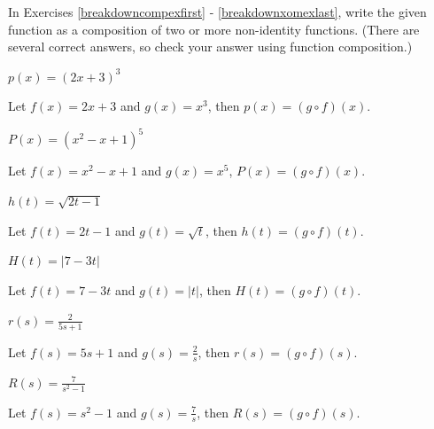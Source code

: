 \documentclass{ximera}
\begin{document}
\begin{question}
In Exercises \ref{breakdowncompexfirst} - \ref{breakdownxomexlast},  write the given function as a composition of two or more non-identity functions.  (There are several correct answers, so check your answer using function composition.)

\begin{problem}\label{breakdowncompexfirst}
$p(x) = (2x+3)^3$ 

\begin{solution}
    Let $f(x) = 2x+3$ and $g(x) = x^3$, then $p(x) = (g\circ f)(x)$.
\end{solution}
\end{problem}

\begin{problem}
$P(x) = \left(x^2-x+1\right)^5$

\begin{solution}
    Let $f(x) = x^2-x+1$ and $g(x) = x^5$,  $P(x) =(g\circ f)(x)$.
\end{solution}
\end{problem} 

\begin{problem}
$h(t) = \sqrt{2t-1}$

\begin{solution}
Let $f(t) = 2t-1$ and $g(t) = \sqrt{t}$, then $h(t) = (g\circ f)(t)$.
\end{solution}
\end{problem}  

\begin{problem}
$H(t) = |7-3t|$

\begin{solution}
    Let $f(t) = 7-3t$ and $g(t) = |t|$, then  $H(t) =  (g\circ f)(t)$.
\end{solution}
\end{problem}

\begin{problem}
$r(s) = \frac{2}{5s+1}$

\begin{solution}
    Let $f(s) = 5s+1$ and $g(s) = \frac{2}{s}$, then $r(s) =(g\circ f)(s)$.
\end{solution}
\end{problem} 

\begin{problem}
$R(s) = \frac{7}{s^2-1}$

\begin{solution}
     Let $f(s) = s^2-1$ and $g(s) = \frac{7}{s}$, then $R(s) =(g\circ f)(s)$.
\end{solution}
\end{problem}


\end{question}
\end{document}
